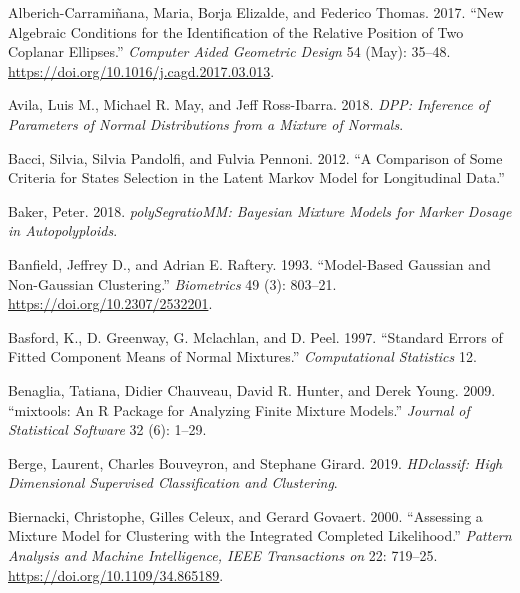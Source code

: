 \hypertarget{refs}{}
\begin{CSLReferences}{1}{0}
\leavevmode{}%
Alberich-Carramiñana, Maria, Borja Elizalde, and Federico Thomas. 2017. {``New Algebraic Conditions for the Identification of the Relative Position of Two Coplanar Ellipses.''} \emph{Computer Aided Geometric Design} 54 (May): 35--48. \url{https://doi.org/10.1016/j.cagd.2017.03.013}.

\leavevmode{}%
Avila, Luis M., Michael R. May, and Jeff Ross-Ibarra. 2018. \emph{DPP: Inference of Parameters of Normal Distributions from a Mixture of Normals}.

\leavevmode{}%
Bacci, Silvia, Silvia Pandolfi, and Fulvia Pennoni. 2012. {``A Comparison of Some Criteria for States Selection in the Latent {Markov} Model for Longitudinal Data.''}

\leavevmode{}%
Baker, Peter. 2018. \emph{polySegratioMM: Bayesian Mixture Models for Marker Dosage in Autopolyploids}.

\leavevmode{}%
Banfield, Jeffrey D., and Adrian E. Raftery. 1993. {``Model-{Based Gaussian} and {Non-Gaussian Clustering}.''} \emph{Biometrics} 49 (3): 803--21. \url{https://doi.org/10.2307/2532201}.

\leavevmode{}%
Basford, K., D. Greenway, G. Mclachlan, and D. Peel. 1997. {``Standard Errors of Fitted Component Means of Normal Mixtures.''} \emph{Computational Statistics} 12.

\leavevmode{}%
Benaglia, Tatiana, Didier Chauveau, David R. Hunter, and Derek Young. 2009. {``{mixtools}: An {R} Package for Analyzing Finite Mixture Models.''} \emph{Journal of Statistical Software} 32 (6): 1--29.

\leavevmode{}%
Berge, Laurent, Charles Bouveyron, and Stephane Girard. 2019. \emph{HDclassif: High Dimensional Supervised Classification and Clustering}.

\leavevmode{}%
Biernacki, Christophe, Gilles Celeux, and Gerard Govaert. 2000. {``Assessing a {Mixture Model} for {Clustering} with the {Integrated Completed Likelihood}.''} \emph{Pattern Analysis and Machine Intelligence, IEEE Transactions on} 22: 719--25. \url{https://doi.org/10.1109/34.865189}.


\end{CSLReferences}
